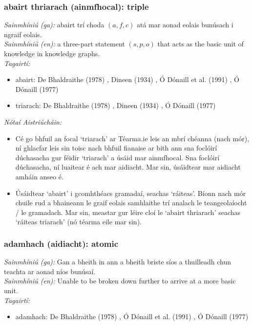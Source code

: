 \subsubsection*{abairt thriarach (ainmfhocal): triple}
 \noindent \textit{Sainmhíniú (ga):} abairt trí choda $(a,f,c)$ atá mar aonad eolais bunúsach i ngraif eolais.
\\
 \noindent \textit{Sainmhíniú (en):} a three-part statement $(s,p,o)$ that acts as the basic unit of knowledge in knowledge graphs.
\\
 \noindent \textit{Tagairtí:}
\begin{itemize}
	\item abairt: De Bhaldraithe (1978) \cite{de-bhaldraithe}, Dineen (1934) \cite{dineen}, Ó Dónaill et al. (1991) \cite{focloir-beag}, Ó Dónaill (1977) \cite{odonaill}
	\item triarach: De Bhaldraithe (1978) \cite{de-bhaldraithe}, Dineen (1934) \cite{dineen}, Ó Dónaill (1977) \cite{odonaill}
\end{itemize}

 \noindent \textit{Nótaí Aistriúcháin:}
\begin{itemize}
	\item Cé go bhfuil an focal `triarach' ar Téarma.ie leis an mbrí chéanna (nach mór), ní ghlacfar leis sin toisc nach bhfuil fianaise ar bith ann sna foclóirí dúchasacha gur féidir `triarach' a úsáid mar ainmfhocal. Sna foclóirí dúchasacha, ní luaitear é ach mar aidiacht. Mar sin, úsáidtear mar aidiacht amháin anseo é.
	\item Úsáidtear `abairt' i gcomhthéacs gramadaí, seachas `ráiteas'. Bíonn nach mór chuile rud a bhaineann le graif eolais samhlaithe trí analach le teangeolaíocht / le gramadach. Mar sin, meastar gur léire cloí le `abairt thriarach' seachas `ráiteas triarach' (nó téarma eile mar sin).
\end{itemize}


\subsubsection*{adamhach (aidiacht): atomic}
 \noindent \textit{Sainmhíniú (ga):} Gan a bheith in ann a bheith briste síos a thuilleadh chun teachta ar aonad níos bunúsaí.
\\
 \noindent \textit{Sainmhíniú (en):} Unable to be broken down further to arrive at a more basic unit.
\\
 \noindent \textit{Tagairtí:}
\begin{itemize}
	\item adamhach: De Bhaldraithe (1978) \cite{de-bhaldraithe}, Ó Dónaill et al. (1991) \cite{focloir-beag}, Ó Dónaill (1977) \cite{odonaill}
\end{itemize}

